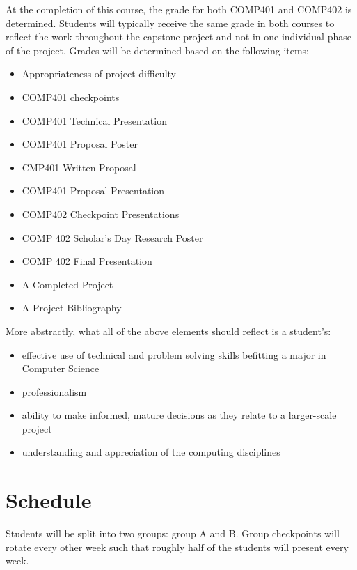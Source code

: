 \documentclass[10pt]{article}
\begin{document}
At the completion of this course, the grade for both COMP401 and COMP402 is determined. Students will typically receive the same grade in both courses to reflect the work throughout the capstone project and not in one individual phase of the project. Grades will be determined based on the following items:
\begin{itemize}
\item Appropriateness of project difficulty
\item COMP401 checkpoints
\item COMP401 Technical Presentation
\item COMP401 Proposal Poster
\item CMP401 Written Proposal
\item COMP401 Proposal Presentation
\item COMP402 Checkpoint Presentations
\item COMP 402 Scholar's Day Research Poster
\item COMP 402 Final Presentation
\item A Completed Project
\item A Project Bibliography
\end{itemize}

More abstractly, what all of the above elements should reflect is a student's:
\begin{itemize}
\item effective use of technical and problem solving skills befitting a major in Computer Science
\item professionalism
\item ability to make informed, mature decisions as they relate to a larger-scale project
\item understanding and appreciation of the computing disciplines
\end{itemize}

\section{Schedule}

Students will be split into two groups: group A and B. Group checkpoints will rotate every other week such that roughly half of the students will present every week.
\end{document}
